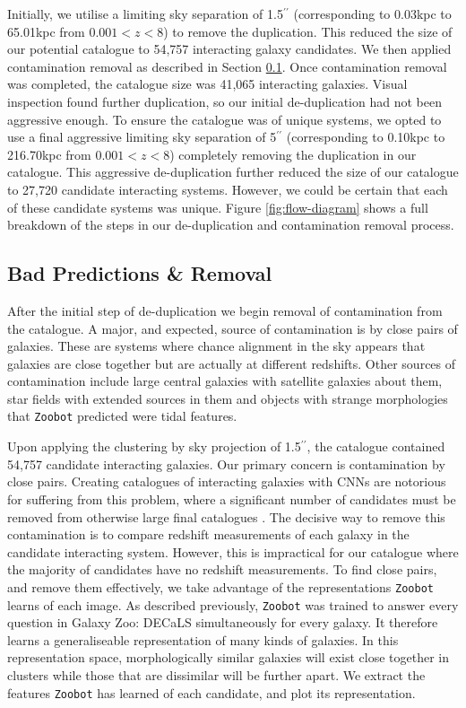 Initially, we utilise a limiting sky separation of 1.5$^{\prime\prime}$ (corresponding to 0.03kpc to 65.01kpc from $0.001 < z < 8$) to remove the duplication. This reduced the size of our potential catalogue to 54,757 interacting galaxy candidates. We then applied contamination removal as described in Section \ref{bad_pred}. Once contamination removal was completed, the catalogue size was 41,065 interacting galaxies. Visual inspection found further duplication, so our initial de-duplication had not been aggressive enough. To ensure the catalogue was of unique systems, we opted to use a final aggressive limiting sky separation of 5$^{\prime\prime}$  (corresponding to 0.10kpc to 216.70kpc from $0.001 < z < 8$) completely removing the duplication in our catalogue. This aggressive de-duplication further reduced the size of our catalogue to 27,720 candidate interacting systems. However, we could be certain that each of these candidate systems was unique. Figure \ref{fig:flow-diagram} shows a full breakdown of the steps in our de-duplication and contamination removal process.

\subsection{Bad Predictions \& Removal}\label{bad_pred}
\noindent After the initial step of de-duplication we begin removal of contamination from the catalogue. A major, and expected, source of contamination is by close pairs of galaxies. These are systems where chance alignment in the sky appears that galaxies are close together but are actually at different redshifts. Other sources of contamination include large central galaxies with satellite galaxies about them, star fields with extended sources in them and objects with strange morphologies that \texttt{Zoobot} predicted were tidal features.

Upon applying the clustering by sky projection of 1.5$^{\prime\prime}$, the catalogue contained 54,757 candidate interacting galaxies. Our primary concern is contamination by close pairs. Creating catalogues of interacting galaxies with CNNs are notorious for suffering from this problem, where a significant number of candidates must be removed from otherwise large final catalogues \citep{2019MNRAS.490.5390B, 2022A&A...661A..52P}. The decisive way to remove this contamination is to compare redshift measurements of each galaxy in the candidate interacting system. However, this is impractical for our catalogue where the majority of candidates have no redshift measurements. To find close pairs, and remove them effectively, we take advantage of the representations \texttt{Zoobot} learns of each image. As described previously, \texttt{Zoobot} was trained to answer every question in Galaxy Zoo: DECaLS simultaneously for every galaxy. It therefore learns a generaliseable representation of many kinds of galaxies. In this representation space, morphologically similar galaxies will exist close together in clusters while those that are dissimilar will be further apart. We extract the features \texttt{Zoobot} has learned of each candidate, and plot its representation.

